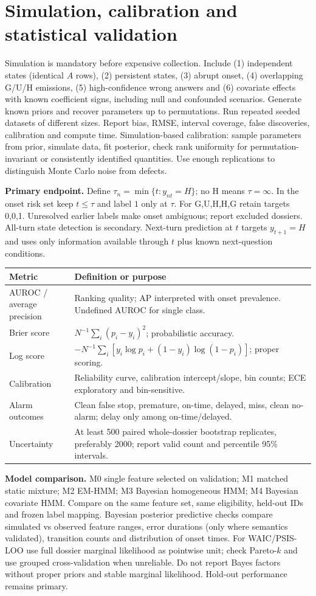 \documentclass[11pt,letterpaper]{article}
\newcommand{\sectionpage}[1]{\clearpage\section{#1}}
\begin{document}
\sectionpage{Simulation, calibration and statistical validation}
Simulation is mandatory before expensive collection. Include (1) independent states (identical $A$ rows), (2) persistent states, (3) abrupt onset, (4) overlapping G/U/H emissions, (5) high-confidence wrong answers and (6) covariate effects with known coefficient signs, including null and confounded scenarios. Generate known priors and recover parameters up to permutations. Run repeated seeded datasets of different sizes. Report bias, RMSE, interval coverage, false discoveries, calibration and compute time. Simulation-based calibration: sample parameters from prior, simulate data, fit posterior, check rank uniformity for permutation-invariant or consistently identified quantities. Use enough replications to distinguish Monte Carlo noise from defects.

\textbf{Primary endpoint.} Define $\tau_n=\min\{t:y_{nt}=H\}$; no H means $\tau=\infty$. In the onset risk set keep $t\le\tau$ and label $1$ only at $\tau$. For G,U,H,H,G retain targets 0,0,1. Unresolved earlier labels make onset ambiguous; report excluded dossiers. All-turn state detection is secondary. Next-turn prediction at $t$ targets $y_{t+1}=H$ and uses only information available through $t$ plus known next-question conditions.


\begin{tabularx}{\linewidth}{p{.27\linewidth}X}
\toprule Metric & Definition or purpose \\ \midrule
AUROC / average precision & Ranking quality; AP interpreted with onset prevalence. Undefined AUROC for single class. \\
Brier score & $N^{-1}\sum_i(p_i-y_i)^2$; probabilistic accuracy. \\
Log score & $-N^{-1}\sum_i[y_i\log p_i+(1-y_i)\log(1-p_i)]$; proper scoring. \\
Calibration & Reliability curve, calibration intercept/slope, bin counts; ECE exploratory and bin-sensitive. \\
Alarm outcomes & Clean false stop, premature, on-time, delayed, miss, clean no-alarm; delay only among on-time/delayed. \\
Uncertainty & At least 500 paired whole-dossier bootstrap replicates, preferably 2000; report valid count and percentile 95\% intervals. \\ \bottomrule
\end{tabularx}

\textbf{Model comparison.} M0 single feature selected on validation; M1 matched static mixture; M2 EM-HMM; M3 Bayesian homogeneous HMM; M4 Bayesian covariate HMM. Compare on the same feature set, same eligibility, held-out IDs and frozen label mapping. Bayesian posterior predictive checks compare simulated vs observed feature ranges, error durations (only where semantics validated), transition counts and distribution of onset times. For WAIC/PSIS-LOO use full dossier marginal likelihood as pointwise unit; check Pareto-$k$ and use grouped cross-validation when unreliable. Do not report Bayes factors without proper priors and stable marginal likelihood. Hold-out performance remains primary.
\end{document}
